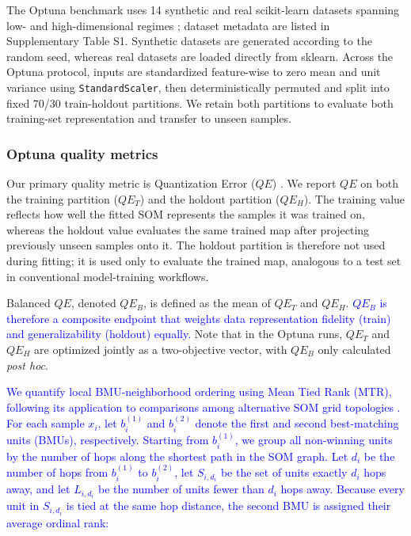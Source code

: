 \documentclass[10pt]{article} %
\newcommand{\TrackedChange}[1]{\textcolor{blue}{#1}}
\begin{document}
The Optuna benchmark uses 14 synthetic and real scikit-learn datasets spanning low- and high-dimensional regimes \citep{pedregosaScikitlearnMachineLearning2011}; dataset metadata are listed in Supplementary Table S1. Synthetic datasets are generated according to the random seed, whereas real datasets are loaded directly from sklearn. Across the Optuna protocol, inputs are standardized feature-wise to zero mean and unit variance using \texttt{StandardScaler}, then deterministically permuted and split into fixed 70/30 train-holdout partitions. We retain both partitions to evaluate both training-set representation and transfer to unseen samples.

\subsubsection{Optuna quality metrics}

Our primary quality metric is Quantization Error ($QE$) \citep{kohonenSelfOrganizingMaps2001}. We report $QE$ on both the training partition ($QE_T$) and the holdout partition ($QE_H$). The training value reflects how well the fitted SOM represents the samples it was trained on, whereas the holdout value evaluates the same trained map after projecting previously unseen samples onto it. The holdout partition is therefore not used during fitting; it is used only to evaluate the trained map, analogous to a test set in conventional model-training workflows.

Balanced $QE$, denoted $QE_B$, is defined as the mean of $QE_T$ and $QE_H$. \TrackedChange{$QE_B$ is therefore a composite endpoint that weights data representation fidelity (train) and generalizability (holdout) equally.} Note that in the Optuna runs, $QE_T$ and $QE_H$ are optimized jointly as a two-objective vector, with $QE_B$ only calculated \emph{post hoc}.

\TrackedChange{We quantify local BMU-neighborhood ordering using Mean Tied Rank (MTR), following its application to comparisons among alternative SOM grid topologies \citep{lopez-rubioGridTopologiesSelforganizing2014}.} \TrackedChange{For each sample $x_i$, let $b_i^{(1)}$ and $b_i^{(2)}$ denote the first and second best-matching units (BMUs), respectively.} \TrackedChange{Starting from $b_i^{(1)}$, we group all non-winning units by the number of hops along the shortest path in the SOM graph.} \TrackedChange{Let $d_i$ be the number of hops from $b_i^{(1)}$ to $b_i^{(2)}$, let $S_{i,d_i}$ be the set of units exactly $d_i$ hops away, and let $L_{i,d_i}$ be the number of units fewer than $d_i$ hops away.} \TrackedChange{Because every unit in $S_{i,d_i}$ is tied at the same hop distance, the second BMU is assigned their average ordinal rank:}
\end{document}
